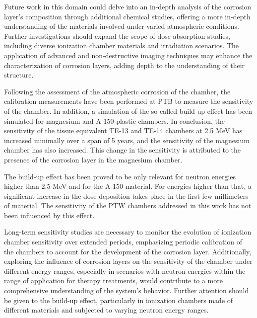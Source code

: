 Future work in this domain could delve into an in-depth analysis of the corrosion layer's composition through additional chemical studies, offering a more in-depth understanding of the materials involved under varied atmospheric conditions. Further investigations should expand the scope of dose absorption studies, including diverse ionization chamber materials and irradiation scenarios. The application of advanced and non-destructive imaging techniques may enhance the characterization of corrosion layers, adding depth to the understanding of their structure.

Following the assessment of the atmospheric corrosion of the chamber, the calibration measurements have been performed at PTB to measure the sensitivity of the chamber. In addition, a simulation of the so-called build-up effect has been simulated for magnesium and A-150 plastic chambers. In conclusion, the sensitivity of the tissue equivalent TE-13 and TE-14 chambers at 2.5 \unit{\mega\electronvolt} has increased minimally over a span of 5 years, and the sensitivity of the magnesium chamber has also increased. This change in the sensitivity is attributed to the presence of the corrosion layer in the magnesium chamber.

The build-up effect has been proved to be only relevant for neutron energies higher than 2.5 \unit{\mega\electronvolt} and for the A-150 material. For energies higher than that, a significant increase in the dose deposition takes place in the first few millimeters of material. The sensitivity of the PTW chambers addressed in this work has not been influenced by this effect.

Long-term sensitivity studies are necessary to monitor the evolution of ionization chamber sensitivity over extended periods, emphasizing periodic calibration of the chambers to account for the development of the corrosion layer. Additionally, exploring the influence of corrosion layers on the sensitivity of the chamber under different energy ranges, especially in scenarios with neutron energies within the range of application for therapy treatments, would contribute to a more comprehensive understanding of the system's behavior. Further attention should be given to the build-up effect, particularly in ionization chambers made of different materials and subjected to varying neutron energy ranges.

